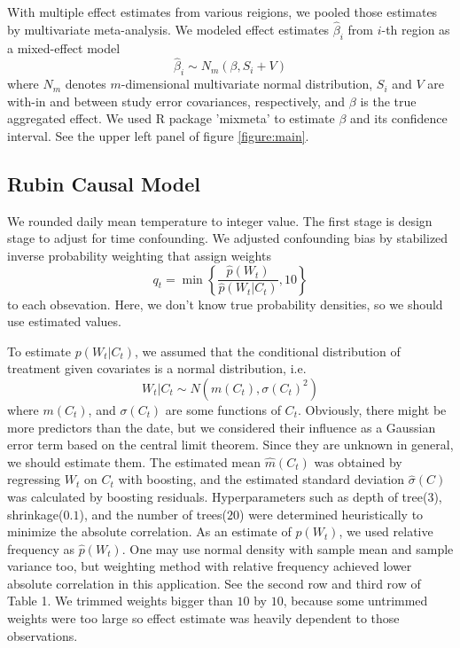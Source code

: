 \documentclass[12pt]{article}
\begin{document}
With multiple effect estimates from various reigions,
we pooled those estimates by multivariate meta-analysis.
We modeled effect estimates $\hat{\beta}_i$ from $i$-th region as a mixed-effect model
\[
	\hat{\beta}_i \sim N_m(\beta, S_i + V)
\]
where $N_m$ denotes $m$-dimensional multivariate normal distribution,
$S_i$ and $V$ are with-in and between study error covariances, respectively,
and $\beta$ is the true aggregated effect.
We used R package 'mixmeta' to estimate $\beta$ and its confidence interval.
See the upper left panel of figure \ref{figure:main}.

\subsection{Rubin Causal Model}

We rounded daily mean temperature to integer value.
The first stage is design stage to adjust for time confounding.
We adjusted confounding bias by stabilized inverse probability weighting\cite{sipw2010}
that assign weights
\[
	q_t = \min{ \left \{ \frac{\hat{p}(W_t)}{\hat{p}(W_t \lvert C_t)}, 10 \right \} }
\]
to each obsevation.
Here, we don't know true probability densities,
so we should use estimated values.

To estimate $p(W_t \lvert C_t)$, 
we assumed that 
the conditional distribution of treatment given covariates is a normal distribution, i.e.
\[ 
	W_t\lvert C_t \sim N(m(C_t), \sigma(C_t)^2) 
\] 
where $m(C_t)$, and $\sigma(C_t)$ are some functions of $C_t$.
Obviously, there might be more predictors than the date,
but we considered their influence as a Gaussian error term based on the central limit theorem.
Since they are unknown in general, we should estimate them. 
The estimated mean $\hat{m}(C_t)$ was obtained by regressing $W_t$ on $C_t$ with boosting, 
and the estimated standard deviation $\hat{\sigma}(C)$ was calculated
by boosting residuals\cite{hirano2004, gpsboosting2015}.
Hyperparameters such as depth of tree($3$), shrinkage($0.1$), and the number of trees($20$) 
were determined heuristically to minimize the absolute correlation.
As an estimate of $p(W_t)$, we used relative frequency as $\hat{p}(W_t)$.
One may use normal density with sample mean and sample variance too, but
weighting method with relative frequency achieved lower absolute correlation in this application.
See the second row and third row of Table 1.
We trimmed weights bigger than $10$ by $10$,
because some untrimmed weights were too large so
effect estimate was heavily dependent to those observations.
\end{document}
